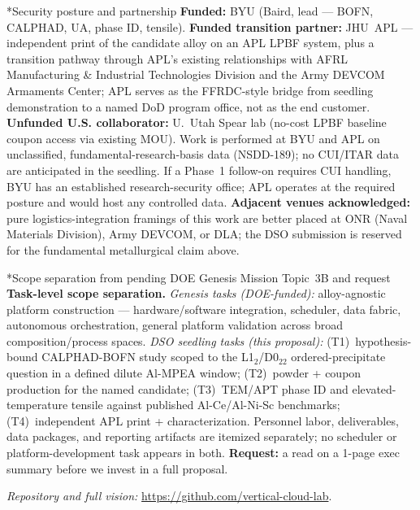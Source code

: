 \documentclass[10pt]{article}
\makeatletter
\renewcommand{\section}{\@startsection{section}{1}{0pt}{0.4ex plus 0.1ex}{0.15ex}{\normalfont\bfseries}}
\makeatother
\begin{document}
\section*{Security posture and partnership}
\textbf{Funded:} BYU (Baird, lead --- BOFN, CALPHAD, UA, phase ID, tensile). \textbf{Funded transition partner:} JHU~APL --- independent print of the candidate alloy on an APL LPBF system, plus a transition pathway through APL's existing relationships with AFRL Manufacturing \& Industrial Technologies Division and the Army DEVCOM Armaments Center; APL serves as the FFRDC-style bridge from seedling demonstration to a named DoD program office, not as the end customer. \textbf{Unfunded U.S. collaborator:} U.~Utah Spear lab (no-cost LPBF baseline coupon access via existing MOU). Work is performed at BYU and APL on unclassified, fundamental-research-basis data (NSDD-189); no CUI/ITAR data are anticipated in the seedling. If a Phase~1 follow-on requires CUI handling, BYU has an established research-security office; APL operates at the required posture and would host any controlled data. \textbf{Adjacent venues acknowledged:} pure logistics-integration framings of this work are better placed at ONR (Naval Materials Division), Army DEVCOM, or DLA; the DSO submission is reserved for the fundamental metallurgical claim above.

\section*{Scope separation from pending DOE Genesis Mission Topic~3B and request}
\textbf{Task-level scope separation.} \emph{Genesis tasks (DOE-funded):} alloy-agnostic platform construction --- hardware/software integration, scheduler, data fabric, autonomous orchestration, general platform validation across broad composition/process spaces. \emph{DSO seedling tasks (this proposal):} (T1)~hypothesis-bound CALPHAD-BOFN study scoped to the L1$_2$/D0$_{22}$ ordered-precipitate question in a defined dilute Al-MPEA window; (T2)~powder + coupon production for the named candidate; (T3)~TEM/APT phase ID and elevated-temperature tensile against published Al-Ce/Al-Ni-Sc benchmarks; (T4)~independent APL print + characterization. Personnel labor, deliverables, data packages, and reporting artifacts are itemized separately; no scheduler or platform-development task appears in both. \textbf{Request:} a read on a 1-page exec summary before we invest in a full proposal.

{\small \emph{Repository and full vision:} \url{https://github.com/vertical-cloud-lab}.}
\end{document}
